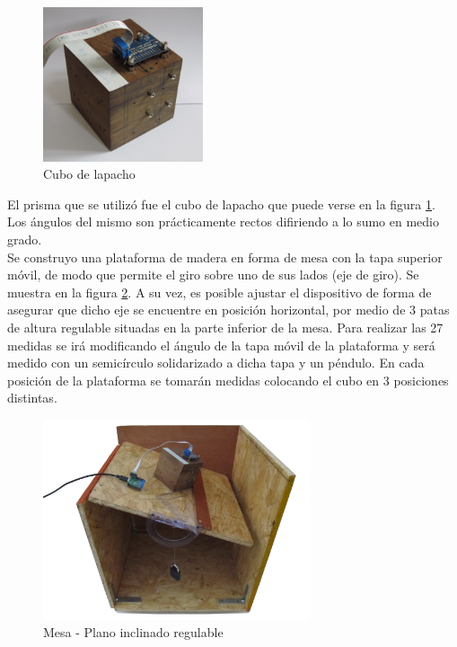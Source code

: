 \documentclass[main]{subfiles}
\begin{document}
\begin{figure}
  \vspace{-20pt}
  \begin{center}
    \includegraphics[width=0.42\textwidth]{./pics_acc/cubo.png}
  \end{center}
  \vspace{-20pt}
  \caption{Cubo de lapacho}
  \label{fig:cubo}
\end{figure}

El prisma que se utilizó fue el cubo de lapacho que puede verse en la figura \ref{fig:cubo}. \\
Los ángulos del mismo son prácticamente rectos difiriendo a lo sumo en medio grado. \\

Se construyo una plataforma de madera en forma de mesa con la tapa superior móvil, de modo que permite el giro sobre uno de sus lados (eje de giro). Se muestra en la figura \ref{fig:mesa-flotando}.  A su vez, es posible ajustar el dispositivo de forma de asegurar que dicho eje se encuentre en posición horizontal, por medio de 3 patas de altura regulable situadas en la parte inferior de la mesa. Para realizar las 27 medidas se irá modificando el ángulo de la tapa móvil de la plataforma y será medido con un semicírculo solidarizado a dicha tapa y un péndulo. En cada posición de la plataforma se tomarán medidas colocando el cubo en 3 posiciones distintas.

\begin{figure}[h!]
	\begin{center}
		\includegraphics[width=0.7\textwidth]{./pics_acc/mesa-flotando.jpg}
	\end{center}
	\vspace{-20pt}
	\caption{Mesa - Plano inclinado regulable}
	\label{fig:mesa-flotando}
\end{figure}
\end{document}

